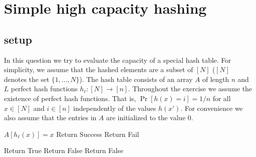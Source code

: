 \documentclass{article}
\begin{document}
\pagebreak






\section{Simple high capacity hashing}
\subsection*{setup}
In this question we try to evaluate the capacity of a special hash table.
For simplicity, we assume that the hashed elements are a subset of $[N]$ ($[N]$ denotes the set $\{1,\dots,N\}$).
The hash table consists of an array $A$ of length $n$ and $L$ perfect hash functions $h_\ell: [N] \rightarrow [n]$.
Throughout the exercise we assume the existence of perfect hash functions. That is, $\Pr[h(x) = i] = 1/n$ for all $x \in [N]$ and $i\in [n]$ 
independently of the values $h(x')$.  For convenience we also assume that the entries in $A$ are initialized to the value $0$.
%
\begin{algorithm}
\caption{$Add(x)$}
\begin{algorithmic}
\FOR {$\ell \in [L]$}
    	\STATE $A[h_\ell(x)] = x$
	\STATE Return Success
    \ENDIF
\ENDFOR
\STATE Return Fail
\end{algorithmic}
\end{algorithm}
%
\vspace{-.6cm}
\begin{algorithm}
\caption{$Query(x)$}
\begin{algorithmic}
\FOR {$\ell \in [L]$}
	\STATE Return True
   	\STATE Return False
    \ENDIF
\ENDFOR
\STATE Return False
\end{algorithmic}
\end{algorithm}
%
\vspace{-.6cm}
\end{document}
